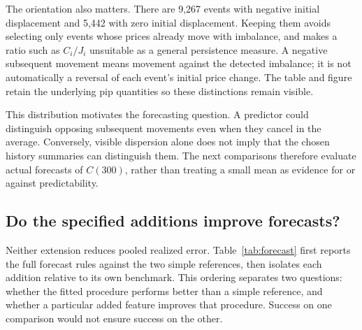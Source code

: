 \documentclass[12pt,letterpaper]{article}
\begin{document}
The orientation also matters. There are 9,267 events with negative initial displacement and 5,442 with zero initial displacement. Keeping them avoids selecting only events whose prices already move with imbalance, and makes a ratio such as $C_i/J_i$ unsuitable as a general persistence measure. A negative subsequent movement means movement against the detected imbalance; it is not automatically a reversal of each event's initial price change. The table and figure retain the underlying pip quantities so these distinctions remain visible.

This distribution motivates the forecasting question. A predictor could distinguish opposing subsequent movements even when they cancel in the average. Conversely, visible dispersion alone does not imply that the chosen history summaries can distinguish them. The next comparisons therefore evaluate actual forecasts of $C(300)$, rather than treating a small mean as evidence for or against predictability.

\subsection{Do the specified additions improve forecasts?}
Neither extension reduces pooled realized error. Table~\ref{tab:forecast} first reports the full forecast rules against the two simple references, then isolates each addition relative to its own benchmark. This ordering separates two questions: whether the fitted procedure performs better than a simple reference, and whether a particular added feature improves that procedure. Success on one comparison would not ensure success on the other.
\end{document}
